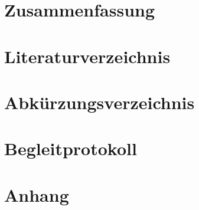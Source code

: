 \documentclass[12pt]{scrreprt}
\begin{document}
	
	
	\pagebreak
	
	\chapter{Zusammenfassung}
	\pagebreak
	
	\chapter{Literaturverzeichnis}
	\pagebreak
	
	\listoffigures
	\pagebreak
	
	\chapter{Abkürzungsverzeichnis}
	\pagebreak
	
	\chapter{Begleitprotokoll}
	
	\chapter{Anhang}
	
	

	
\end{document}
